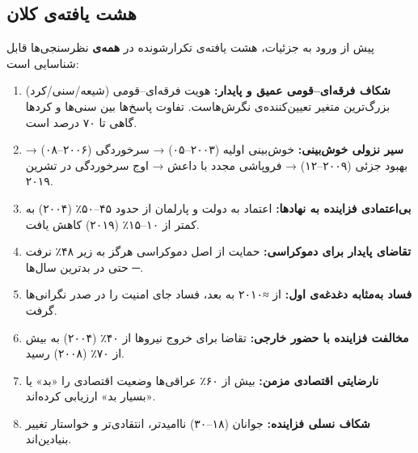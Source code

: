 
\subsection{هشت یافته‌ی کلان}

پیش از ورود به جزئیات، هشت یافته‌ی تکرارشونده در
\textbf{همه‌ی} نظرسنجی‌ها قابل شناسایی است:

\begin{enumerate}[rightmargin=1cm, itemsep=6pt]

\item \textbf{شکاف فرقه‌ای–قومی عمیق و پایدار:}
هویت فرقه‌ای–قومی (شیعه/سنی/کرد) بزرگ‌ترین متغیر تعیین‌کننده‌ی
نگرش‌هاست. تفاوت پاسخ‌ها بین سنی‌ها و کردها گاهی تا ۷۰ درصد است.

\item \textbf{سیر نزولی خوش‌بینی:}
خوش‌بینی اولیه (۲۰۰۳–۰۵) → سرخوردگی (۲۰۰۶–۰۸) → بهبود جزئی
(۲۰۰۹–۱۲) → فروپاشی مجدد با داعش → اوج سرخوردگی در تشرین ۲۰۱۹.

\item \textbf{بی‌اعتمادی فزاینده به نهادها:}
اعتماد به دولت و پارلمان از حدود ۴۵–۵۰٪ (۲۰۰۴) به کمتر از ۱۰–۱۵٪
(۲۰۱۹) کاهش یافت.

\item \textbf{تقاضای پایدار برای دموکراسی:}
حمایت از اصل دموکراسی هرگز به زیر ۴۸٪ نرفت ─ حتی در بدترین سال‌ها.

\item \textbf{فساد به‌مثابه دغدغه‌ی اول:}
از ≈۲۰۱۰ به بعد، فساد جای امنیت را در صدر نگرانی‌ها گرفت.

\item \textbf{مخالفت فزاینده با حضور خارجی:}
تقاضا برای خروج نیروها از ۴۰٪ (۲۰۰۴) به بیش از ۷۰٪ (۲۰۰۸) رسید.

\item \textbf{نارضایتی اقتصادی مزمن:}
بیش از ۶۰٪ عراقی‌ها وضعیت اقتصادی را «بد» یا «بسیار بد» ارزیابی کرده‌اند.

\item \textbf{شکاف نسلی فزاینده:}
جوانان (۱۸–۳۰) ناامیدتر، انتقادی‌تر و خواستار تغییر بنیادین‌اند.

\end{enumerate}



